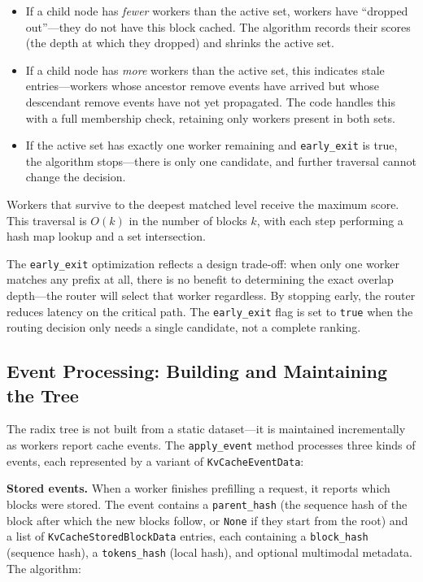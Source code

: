 \begin{itemize}
  \item If a child node has \emph{fewer} workers than the active set, workers have ``dropped out''---they do not have this block cached. The algorithm records their scores (the depth at which they dropped) and shrinks the active set.
  \item If a child node has \emph{more} workers than the active set, this indicates stale entries---workers whose ancestor remove events have arrived but whose descendant remove events have not yet propagated. The code handles this with a full membership check, retaining only workers present in both sets.
  \item If the active set has exactly one worker remaining and \texttt{early\_exit} is true, the algorithm stops---there is only one candidate, and further traversal cannot change the decision.
\end{itemize}

Workers that survive to the deepest matched level receive the maximum score. This traversal is $O(k)$ in the number of blocks $k$, with each step performing a hash map lookup and a set intersection.

\begin{notebox}
The \texttt{early\_exit} optimization reflects a design trade-off: when only one worker matches any prefix at all, there is no benefit to determining the exact overlap depth---the router will select that worker regardless. By stopping early, the router reduces latency on the critical path. The \texttt{early\_exit} flag is set to \texttt{true} when the routing decision only needs a single candidate, not a complete ranking.
\end{notebox}

\subsection{Event Processing: Building and Maintaining the Tree}

The radix tree is not built from a static dataset---it is maintained incrementally as workers report cache events. The \texttt{apply\_event} method processes three kinds of events, each represented by a variant of \texttt{KvCacheEventData}:

\textbf{Stored events.} When a worker finishes prefilling a request, it reports which blocks were stored. The event contains a \texttt{parent\_hash} (the sequence hash of the block after which the new blocks follow, or \texttt{None} if they start from the root) and a list of \texttt{KvCacheStoredBlockData} entries, each containing a \texttt{block\_hash} (sequence hash), a \texttt{tokens\_hash} (local hash), and optional multimodal metadata. The algorithm:

